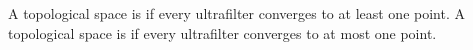 A topological space is  if every ultrafilter converges to at least one point. A topological space is  if every ultrafilter converges to at most one point.
